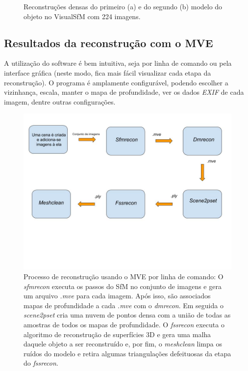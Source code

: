 \begin{figure}[!h]
	\centering
	\caption{Reconstruções densas do primeiro (a) e do segundo (b) modelo do objeto no VisualSfM com 224 imagens.
	}
\end{figure}


\subsection{Resultados da reconstrução com o MVE}

A utilização do software é bem intuitiva, seja por linha de comando ou pela
interface gráfica (neste modo, fica mais fácil visualizar cada etapa da
reconstrução). O programa é amplamente configurável, podendo escolher a vizinhança, escala,
manter o mapa de profundidade, ver os dados \emph{EXIF} de cada imagem, dentre
outras configurações.


\begin{figure}[!h]
	\centering
	\includegraphics[width=0.5\linewidth]{figs/pipelineMVE.jpg}
	\caption{%
	Processo de reconstrução usando o MVE por linha de comando: O \emph{sfmrecon} executa os passos do SfM no conjunto de imagens e gera um arquivo \emph{.mve} para cada imagem. Após isso, são associados mapas de profundidade a cada \emph{.mve} com o \emph{dmrecon}. Em seguida o \emph{scene2pset} cria uma nuvem de pontos densa com a união de todas as amostras de todos os mapas de profundidade. O \emph{fssrecon} executa o algoritmo de reconstrução de superfícies 3D e gera uma malha daquele objeto a ser reconstruído e, por fim, o \emph{meshclean} limpa os ruídos do modelo e retira algumas triangulações defeituosas da etapa do \emph{fssrecon}.
	}
\end{figure}

